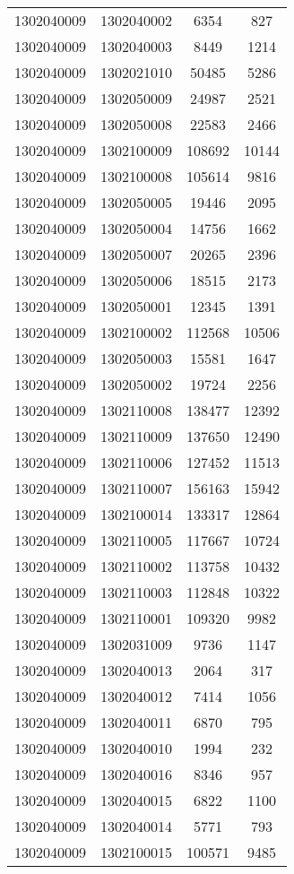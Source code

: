 \begin{longtable}{llcc}
1302040009 & 1302040002 & 6354 & 827\\
1302040009 & 1302040003 & 8449 & 1214\\
1302040009 & 1302021010 & 50485 & 5286\\
1302040009 & 1302050009 & 24987 & 2521\\
1302040009 & 1302050008 & 22583 & 2466\\
1302040009 & 1302100009 & 108692 & 10144\\
1302040009 & 1302100008 & 105614 & 9816\\
1302040009 & 1302050005 & 19446 & 2095\\
1302040009 & 1302050004 & 14756 & 1662\\
1302040009 & 1302050007 & 20265 & 2396\\
1302040009 & 1302050006 & 18515 & 2173\\
1302040009 & 1302050001 & 12345 & 1391\\
1302040009 & 1302100002 & 112568 & 10506\\
1302040009 & 1302050003 & 15581 & 1647\\
1302040009 & 1302050002 & 19724 & 2256\\
1302040009 & 1302110008 & 138477 & 12392\\
1302040009 & 1302110009 & 137650 & 12490\\
1302040009 & 1302110006 & 127452 & 11513\\
1302040009 & 1302110007 & 156163 & 15942\\
1302040009 & 1302100014 & 133317 & 12864\\
1302040009 & 1302110005 & 117667 & 10724\\
1302040009 & 1302110002 & 113758 & 10432\\
1302040009 & 1302110003 & 112848 & 10322\\
1302040009 & 1302110001 & 109320 & 9982\\
1302040009 & 1302031009 & 9736 & 1147\\
1302040009 & 1302040013 & 2064 & 317\\
1302040009 & 1302040012 & 7414 & 1056\\
1302040009 & 1302040011 & 6870 & 795\\
1302040009 & 1302040010 & 1994 & 232\\
1302040009 & 1302040016 & 8346 & 957\\
1302040009 & 1302040015 & 6822 & 1100\\
1302040009 & 1302040014 & 5771 & 793\\
1302040009 & 1302100015 & 100571 & 9485\\

\end{longtable}
